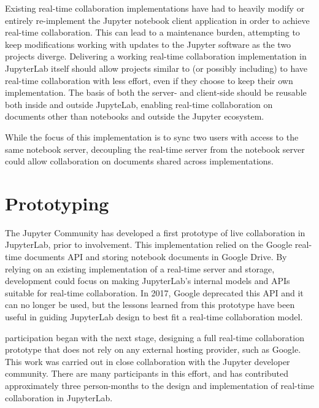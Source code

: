 \documentclass{deliverablereport}
\begin{document}
Existing real-time collaboration implementations have had to heavily
modify or entirely re-implement the Jupyter notebook client application in order to achieve real-time collaboration.
This can lead to a maintenance burden,
attempting to keep modifications working with updates to the Jupyter software
as the two projects diverge.
Delivering a working real-time collaboration implementation in JupyterLab itself
should allow projects similar to (or possibly including) \cocalc
to have real-time collaboration with less effort,
even if they choose to keep their own implementation.
The basis of both the server- and client-side should be reusable
both inside and outside JupyteLab,
enabling real-time collaboration on documents other than notebooks
and outside the Jupyter ecosystem.

While the focus of this implementation is to sync two users with access to the same notebook server,
decoupling the real-time server from the notebook server could allow
collaboration on documents shared across implementations.



\section{Prototyping}

The Jupyter Community has developed a first prototype of live collaboration in JupyterLab,
prior to \ODK involvement.
This implementation relied on the Google real-time documents API and storing notebook documents in Google Drive.
By relying on an existing implementation of a real-time server and storage,
development could focus on making JupyterLab's
internal models and APIs suitable for real-time collaboration.
In 2017, Google deprecated this API and it can no longer be used,
but the lessons learned from this prototype have been useful in guiding JupyterLab design to best fit a real-time collaboration model.

\ODK participation began with the next stage, designing a full real-time collaboration prototype
that does not rely on any external hosting provider,
such as Google.
This work was carried out in close collaboration with the Jupyter developer community.
There are many participants in this effort, and \ODK has contributed approximately
three person-months to the design and implementation of real-time collaboration in JupyterLab.
\end{document}
